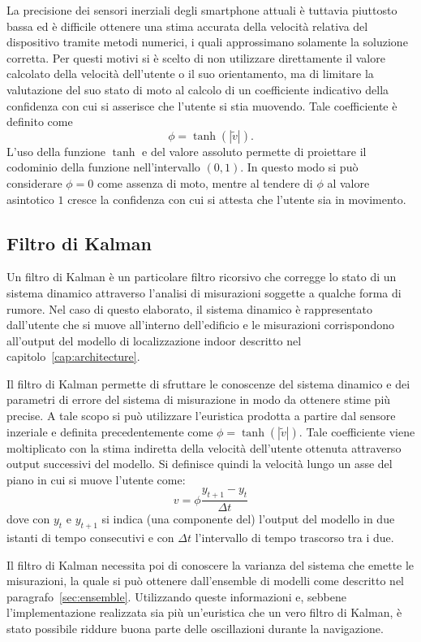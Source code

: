 La precisione dei sensori inerziali degli smartphone attuali è tuttavia
piuttosto bassa ed è difficile ottenere una stima accurata della velocità
relativa del dispositivo tramite metodi numerici, i quali approssimano
solamente la soluzione corretta. Per questi motivi si è scelto di non
utilizzare direttamente il valore calcolato della velocità dell'utente o il suo
orientamento, ma di limitare la valutazione del suo stato di moto al calcolo di
un coefficiente indicativo della confidenza con cui si asserisce che l'utente
si stia muovendo. Tale coefficiente è definito come
\[ \phi = \tanh(|\tilde{v}|). \]
L'uso della funzione \(\tanh\) e del valore assoluto permette di proiettare il
codominio della funzione nell'intervallo \( (0,1) \). In questo modo
si può considerare \(\phi = 0\) come assenza di moto, mentre al tendere di
\(\phi\) al valore asintotico \(1\) cresce la confidenza con cui si attesta
che l'utente sia in movimento.

\subsection{Filtro di Kalman}\label{sec:kalman}
Un filtro di Kalman è un particolare filtro ricorsivo che corregge lo stato di
un sistema dinamico attraverso l'analisi di misurazioni soggette a qualche
forma di rumore. Nel caso di questo elaborato, il sistema dinamico è
rappresentato dall'utente che si muove all'interno dell'edificio e le
misurazioni corrispondono all'output del modello di localizzazione indoor
descritto nel capitolo~\ref{cap:architecture}.

Il filtro di Kalman permette di sfruttare le conoscenze del sistema dinamico e
dei parametri di errore del sistema di misurazione in modo da ottenere stime
più precise. A tale scopo si può utilizzare l'euristica prodotta a partire dal
sensore inzeriale e definita precedentemente come \(\phi = \tanh(|\tilde{v}|)\).
Tale coefficiente viene moltiplicato con la stima indiretta della velocità
dell'utente ottenuta attraverso output successivi del modello. Si definisce
quindi la velocità lungo un asse del piano in cui si muove l'utente come:
\[ v = \phi \frac{y_{t+1} - y_t}{\Delta t} \]
dove con \(y_t\) e \(y_{t+1}\) si indica (una componente del) l'output del
modello in due istanti di tempo consecutivi e con \(\Delta t\) l'intervallo di
tempo trascorso tra i due.

Il filtro di Kalman necessita poi di conoscere la varianza del sistema che
emette le misurazioni, la quale si può ottenere dall'ensemble di modelli come
descritto nel paragrafo~\ref{sec:ensemble}. Utilizzando queste informazioni e,
sebbene l'implementazione realizzata sia più un'euristica che un vero filtro di
Kalman, è stato possibile riddure buona parte delle oscillazioni durante la
navigazione.




